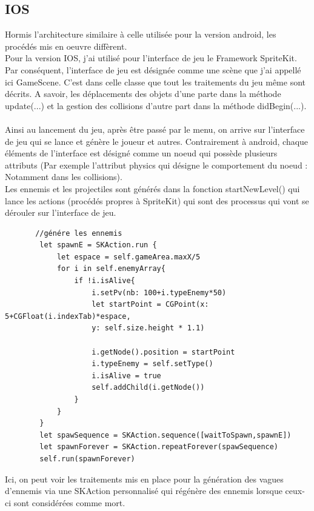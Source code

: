 \documentclass{article}
\begin{document}
\subsection{IOS}
Hormis l'architecture similaire à celle utilisée pour la version android, les procédés mis en oeuvre diffèrent. \\
Pour la version IOS, j'ai utilisé pour l'interface de jeu le Framework SpriteKit. \\ 
Par conséquent, l'interface de jeu est désignée comme une scène que j'ai appellé ici GameScene. C'est dans celle classe que tout les traitements du jeu même sont décrits. A savoir, les déplacements des objets d'une parte dans la méthode update(...) et la gestion des collisions d'autre part dans la méthode didBegin(...). \\ \\
Ainsi au lancement du jeu, après être passé par le menu, on arrive sur l'interface de jeu qui se lance et génère le joueur et autres. Contrairement à android, chaque éléments de l'interface est désigné comme un noeud qui possède plusieurs attributs (Par exemple l'attribut physics qui désigne le comportement du noeud : Notamment dans les collisions).\\ 
Les ennemis et les projectiles sont générés dans la fonction startNewLevel() qui lance les actions (procédés propres à SpriteKit) qui sont des processus qui vont se dérouler sur l'interface de jeu.
\begin{verbatim}
       //génére les ennemis
        let spawnE = SKAction.run {
            let espace = self.gameArea.maxX/5
            for i in self.enemyArray{
                if !i.isAlive{
                    i.setPv(nb: 100+i.typeEnemy*50)
                    let startPoint = CGPoint(x: 5+CGFloat(i.indexTab)*espace,
                    y: self.size.height * 1.1)
                    
                    i.getNode().position = startPoint
                    i.typeEnemy = self.setType()
                    i.isAlive = true
                    self.addChild(i.getNode())
                }
            }
        }
        let spawSequence = SKAction.sequence([waitToSpawn,spawnE])
        let spawnForever = SKAction.repeatForever(spawSequence)
        self.run(spawnForever)
\end{verbatim}
Ici, on peut voir les traitements mis en place pour la génération des vagues d'ennemis via une SKAction personnalisé qui régénère des ennemis lorsque ceux-ci sont considérées comme mort.\\ 
\end{document}
